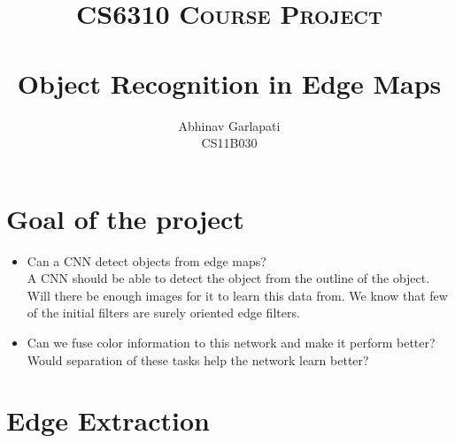 \documentclass[paper=a4, fontsize=11pt]{scrartcl} %
\title{
\normalfont \normalsize
\textsc{CS6310 Course Project} \\ [25pt] %
\horrule{0.5pt} \\[0.4cm] %
\huge Object Recognition in Edge Maps
\horrule{2pt} \\[0.5cm] %
}
\author{Abhinav Garlapati \\ CS11B030}
\date{}
\numberwithin{equation}{section} %
\numberwithin{figure}{section} %
\numberwithin{table}{section} %
\begin{document}
\maketitle %


\section{Goal of the project}
\begin{itemize}
	\item{Can a CNN detect objects from edge maps?\\
		A CNN should be able to detect the object from the outline of the object. Will there be enough images for it to learn this data from. We know that few of the initial filters are surely oriented edge filters. 
		}
	\item{Can we fuse color information to this network and make it perform better?\\
		Would separation of these tasks help the network learn better?		
		}
\end{itemize}
\section{Edge Extraction}
\end{document}
